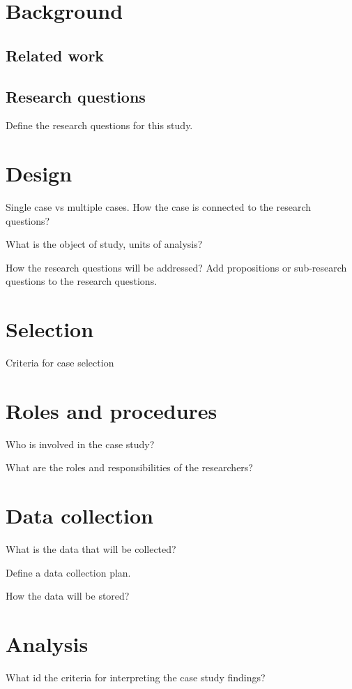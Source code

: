 \section{Background}
\label{sec:background}


\subsection{Related work}
\label{subsec:relatedwork}

\subsection{Research questions}
\label{subsec:rqs}
Define the research questions for this study. 

\section{Design}
\label{sec:design}
Single case vs multiple cases. How the case is connected to the research questions?

What is the object of study, units of analysis?

How the research questions will be addressed? Add propositions or sub-research questions to the research questions. 

\section{Selection}
\label{sec:selection}
Criteria for case selection

\section{Roles and procedures}
\label{sec:roles}
Who is involved in the case study?

What are the roles and responsibilities of the researchers?


\section{Data collection}
\label{sec:datacollection}
What is the data that will be collected?

Define a data collection plan.

How the data will be stored?

\section{Analysis}
\label{sec:analysis}
What id the criteria for interpreting the case study findings?

